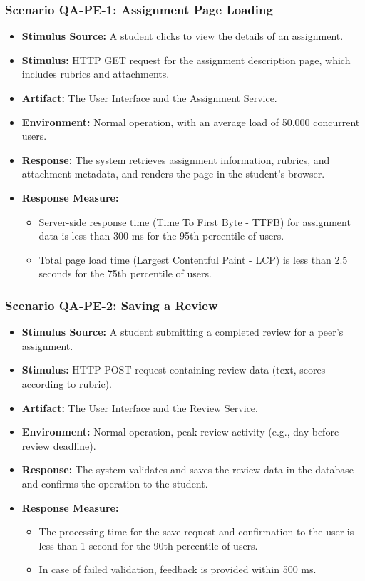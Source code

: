 \subsubsection{Scenario QA-PE-1: Assignment Page Loading}
\begin{itemize}
    \item \textbf{Stimulus Source:} A student clicks to view the details of an assignment.
    \item \textbf{Stimulus:} HTTP GET request for the assignment description page, which includes rubrics and attachments.
    \item \textbf{Artifact:} The User Interface and the Assignment Service.
    \item \textbf{Environment:} Normal operation, with an average load of 50,000 concurrent users.
    \item \textbf{Response:} The system retrieves assignment information, rubrics, and attachment metadata, and renders the page in the student's browser.
    \item \textbf{Response Measure:}
    \begin{itemize}
        \item Server-side response time (Time To First Byte - TTFB) for assignment data is less than 300 ms for the 95th percentile of users.
        \item Total page load time (Largest Contentful Paint - LCP) is less than 2.5 seconds for the 75th percentile of users.
    \end{itemize}
\end{itemize}

\subsubsection{Scenario QA-PE-2: Saving a Review}
\begin{itemize}
    \item \textbf{Stimulus Source:} A student submitting a completed review for a peer's assignment.
    \item \textbf{Stimulus:} HTTP POST request containing review data (text, scores according to rubric).
    \item \textbf{Artifact:} The User Interface and the Review Service.
    \item \textbf{Environment:} Normal operation, peak review activity (e.g., day before review deadline).
    \item \textbf{Response:} The system validates and saves the review data in the database and confirms the operation to the student.
    \item \textbf{Response Measure:}
    \begin{itemize}
        \item The processing time for the save request and confirmation to the user is less than 1 second for the 90th percentile of users.
        \item In case of failed validation, feedback is provided within 500 ms.
    \end{itemize}
\end{itemize}

